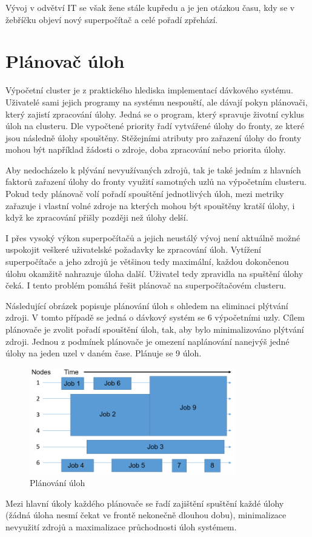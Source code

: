 Vývoj v odvětví IT se však žene stále kupředu a je jen otázkou času, kdy se v žebříčku objeví nový superpočítač a celé pořadí zpřehází.

\section{Plánovač úloh}
Výpočetní cluster je z praktického hlediska implementací dávkového systému. Uživatelé sami jejich programy na systému nespouští, ale dávají pokyn plánovači, který zajistí zpracování úlohy. Jedná se o program, který spravuje životní cyklus úloh na clusteru. Dle vypočtené priority řadí vytvářené úlohy do fronty, ze které jsou následně úlohy spouštěny. Stěžejními atributy pro zařazení úlohy do fronty mohou být například žádosti o zdroje, doba zpracování nebo priorita úlohy.

Aby nedocházelo k plývání nevyužívaných zdrojů, tak je také jedním z hlavních faktorů zařazení úlohy do fronty využití samotných uzlů na výpočetním clusteru. Pokud tedy plánovač volí pořadí spouštění jednotlivých úloh, mezi metriky zařazuje i vlastní volné zdroje na kterých mohou být spouštěny kratší úlohy, i když ke zpracování přišly později než úlohy delší.

I přes vysoký výkon superpočítačů a jejich neustálý vývoj není aktuálně možné uspokojit veškeré uživatelské požadavky ke zpracování úloh. Vytížení superpočítače a jeho zdrojů je většinou tedy maximální, každou dokončenou úlohu okamžitě nahrazuje úloha další. Uživatel tedy zpravidla na spuštění úlohy čeká. I tento problém pomáhá řešit plánovač na superpočítačovém clusteru. 

Následující obrázek popisuje plánování úloh s ohledem na eliminaci plýtvání zdroji. V tomto případě se jedná o dávkový systém se 6 výpočetními uzly. Cílem plánovače je zvolit pořadí spouštění úloh, tak, aby bylo minimalizováno plýtvání zdroji. Jednou z podmínek plánovače je omezení naplánování nanejvýš jedné úlohy na jeden uzel v daném čase. Plánuje se 9 úloh.

\begin{figure}[h]
	\centering
	\includegraphics[width=0.8\textwidth]{Figures/Scheduler.png}
	\caption{Plánování úloh \cite{W94NKRaxvG2L2A1W}}
	\label{fig:WritingThesis}
\end{figure}

Mezi hlavní úkoly každého plánovače se řadí zajištění spuštění každé úlohy (žádná úloha nesmí čekat ve frontě nekonečně dlouhou dobu), minimalizace nevyužití zdrojů a maximalizace průchodnosti úloh systémem.
